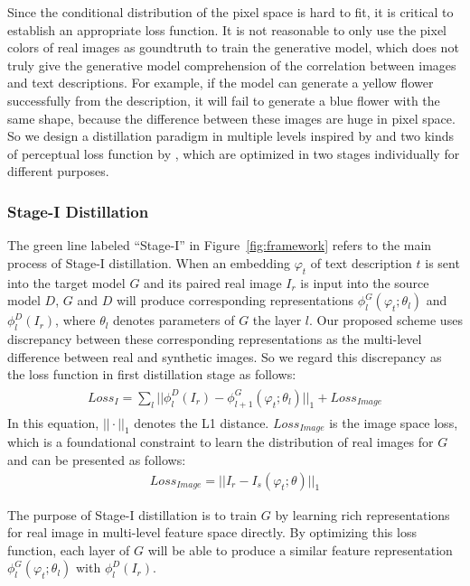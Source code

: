 \documentclass[sigconf]{acmart}
\begin{document}
Since the conditional distribution of the pixel space is hard to fit, it is critical to establish an appropriate loss function. It is not reasonable to only use the pixel colors of real images as goundtruth to train the generative model, which does not truly give the generative model comprehension of the correlation between images and text descriptions. For example, if the model can generate a yellow flower successfully from the description, it will fail to generate a blue flower with the same shape, because the difference between these images are huge in pixel space. So we design a distillation paradigm in multiple levels inspired by \cite{gupta2016cross} and two kinds of perceptual loss function by \cite{chen2017photographic}, which are optimized in two stages individually for different purposes.

\subsubsection{Stage-I Distillation}
The green line labeled ``Stage-I'' in Figure~\ref{fig:framework} refers to the main process of Stage-I distillation. When an embedding $\varphi_t$ of text description $t$ is sent into the target model $G$ and its paired real image $I_r$ is input into the source model $D$, $G$ and $D$ will produce corresponding representations $\phi_l^G(\varphi_t;\theta_l)$ and $\phi_l^D(I_r)$, where $\theta_l$ denotes parameters of $G$ the layer $l$. Our proposed scheme uses discrepancy between these corresponding representations as the multi-level difference between real and synthetic images. So we regard this discrepancy as the loss function in first distillation stage as follows:
\begin{align}
	\begin{split}
		Loss_{I} = \sum_l || \phi_l^D(I_r) - \phi_{l+1}^G(\varphi_t;\theta_l) ||_1 + Loss_{Image}
	\end{split}
\end{align}
In this equation, $||\cdot||_1$ denotes the L1 distance.  $ Loss_{Image}$ is the image space loss, which is a foundational constraint to learn the distribution of real images for $G$ and can be presented as follows:
\begin{align}
	Loss_{Image} = || I_r - I_s(\varphi_t;\theta) ||_1
\end{align}

The purpose of Stage-I distillation is to train $G$ by learning rich representations for real image in multi-level feature space directly. By optimizing this loss function, each layer of $G$ will be able to produce a similar feature representation $\phi_l^G(\varphi_t;\theta_l)$ with $\phi_l^D(I_r)$.
\end{document}
